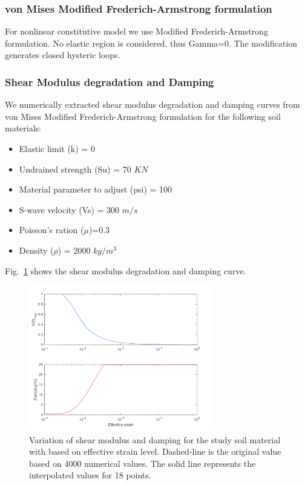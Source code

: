 \subsubsection{von Mises Modified Frederich-Armstrong formulation}

For nonlinear constitutive model we use Modified Frederich-Armstrong formulation. No elastic region is considered, thus Gamma=0. The modification generates closed hysteric loops.

\subsubsection{Shear Modulus degradation and Damping}

We numerically extracted shear modulus degradation and damping curves from von Mises Modified Frederich-Armstrong formulation for the following soil materials:

\begin{itemize}
\item Elastic limit (k) = 0
\item Undrained strength (Su) = 70 $KN$
\item Material parameter to adjust (psi) = 100
\item S-wave velocity (Vs) = 300 $m/s$
\item Poisson's ration ($\mu$)=0.3
\item Density ($\rho$) = 2000 $kg/m^3$
\end{itemize}

Fig.~\ref{fig:GD_18_points_FAM_su70kn_psi100_vs300} shows the shear modulus degradation and damping curve. 

 \begin{figure}[H]
    \centering
    \includegraphics[width=300px]{figures/pdf/GD_18_points_FAM_su70kn_psi100_vs300.pdf}
    \caption{Variation of shear modulus and damping for the study soil material with based on effective strain level. Dashed-line is the original value based on 4000 numerical values. The solid line represents the interpolated values for 18 points.}
    \label{fig:GD_18_points_FAM_su70kn_psi100_vs300}
\end{figure}






